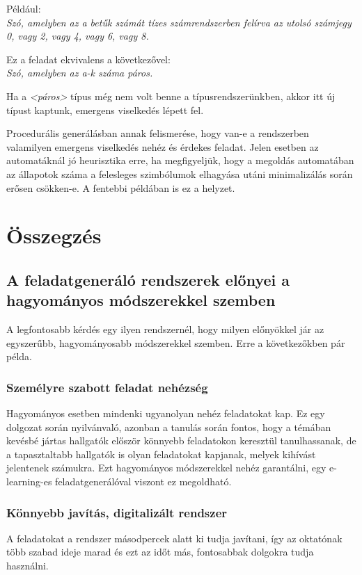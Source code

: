\documentclass[12pt]{report}
\theoremstyle{definition}
\begin{document}
Például:\\
\textit{Szó, amelyben az a betűk számát tízes számrendszerben felírva az utolsó számjegy 0, vagy 2, vagy 4, vagy 6, vagy 8.}

Ez a feladat ekvivalens a következővel:\\
\textit{Szó, amelyben az a-k száma páros.}

Ha a \textit{<páros>} típus még nem volt benne a típusrendszerünkben, akkor itt új típust kaptunk, emergens viselkedés lépett fel.

Procedurális generálásban annak felismerése, hogy van-e a rendszerben valamilyen emergens viselkedés nehéz és érdekes feladat. Jelen esetben az automatáknál jó heurisztika erre, ha megfigyeljük, hogy a megoldás automatában az állapotok száma a felesleges szimbólumok elhagyása utáni minimalizálás során erősen csökken-e. A fentebbi példában is ez a helyzet.

\chapter{Összegzés}

\section{A feladatgeneráló rendszerek előnyei a hagyományos módszerekkel szemben} 
A legfontosabb kérdés egy ilyen rendszernél, hogy milyen előnyökkel jár az egyszerűbb, hagyományosabb módszerekkel szemben. Erre a következőkben pár példa.

\subsection*{Személyre szabott feladat nehézség}
Hagyományos esetben mindenki ugyanolyan nehéz feladatokat kap. Ez egy dolgozat során nyilvánvaló, azonban a tanulás során fontos, hogy a témában kevésbé jártas hallgatók először könnyebb feladatokon keresztül tanulhassanak, de a tapasztaltabb hallgatók is olyan feladatokat kapjanak, melyek kihívást jelentenek számukra. Ezt hagyományos módszerekkel nehéz garantálni, egy e-learning-es feladatgenerálóval viszont ez megoldható.

\subsection*{Könnyebb javítás, digitalizált rendszer}
A feladatokat a rendszer másodpercek alatt ki tudja javítani, így az oktatónak több szabad ideje marad és ezt az időt más, fontosabbak dolgokra tudja használni.
\end{document}
